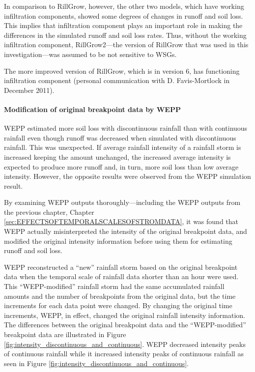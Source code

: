 In comparison to RillGrow, however, the other two models, which have working
infiltration components, showed some degrees of changes in runoff and soil loss.
This implies that infiltration component plays an important role in making the
differences in the simulated runoff and soil loss rates. Thus, without the
working infiltration component, RillGrow2---the version of RillGrow that was
used in this investigation---was assumed to be not sensitive to WSGs.

The more improved version of RillGrow, which is in version 6, has functioning
infiltration component (personal communication with D. Favis-Mortlock in
December 2011).

\paragraph{Modification of original breakpoint data by WEPP}
\label{sec:WEPPModificationofBP} WEPP estimated more
soil loss with discontinuous rainfall than with continuous rainfall even though
runoff was decreased when simulated with discontinuous rainfall. This was
unexpected. If average rainfall intensity of a rainfall storm is
increased keeping the amount unchanged, the increased average intensity is
expected to produce more runoff and, in turn, more soil loss than low average
intensity. However, the opposite results were observed from the WEPP simulation
result.

By examining WEPP outputs thoroughly---including the WEPP outputs from
the previous chapter, Chapter \ref{sec:EFFECTSOFTEMPORALSCALESOFSTROMDATA}, it
was found that WEPP actually misinterpreted the intensity of the original
breakpoint data, and modified the original intensity
information before using them for estimating runoff and soil loss.

WEPP reconstructed a ``new'' rainfall storm based on the original breakpoint
data when the temporal scale of rainfall data shorter than an hour were used.
This ``WEPP-modified'' rainfall storm had the same accumulated rainfall
amounts and the number of breakpoints from the original data, but the time
increments for each data point were changed. By changing the original time
increments, WEPP, in effect, changed the original rainfall intensity
information. The differences between the original breakpoint data and the
``WEPP-modified'' breakpoint data are illustrated in Figure
\ref{fig:intensity_discontinuous_and_continuous}. WEPP decreased intensity peaks
of continuous rainfall while it increased intensity peaks of continuous rainfall
as seen in Figure \ref{fig:intensity_discontinuous_and_continuous}.

